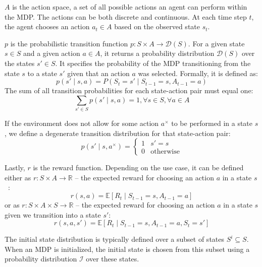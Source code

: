 \documentclass[
  digital,     %
  oneside,     %
  nosansbold,  %
  nocolorbold, %
  lof,         %
  lot,         %
]{fithesis4}
\begin{document}
$A$ is the action space, a set of all possible actions an agent can perform within the MDP. The actions can be both discrete and continuous. At each time step $t$, the agent chooses an action $a_t\in A$ based on the observed state $s_t$.

$p$ is the probabilistic transition function $p\colon S \times A \to \mathcal{D}(S)$. For a given state $s\in S$ and a given action $a\in A$, it returns a probability distribution $\mathcal{D}(S)$ over the states $s'\in S$. It specifies the probability of the MDP transitioning from the state $s$ to a state $s'$ given that an action $a$ was selected. Formally, it is defined as:
\begin{equation}
p(s' \mid s,a)=P(S_t=s'\mid S_{t-1}=s,A_{t-1}=a)    
\end{equation}
The sum of all transition probabilities for each state-action pair must equal one:
\begin{equation}
\sum_{s'\in S} p(s'\mid s,a)=1, \forall s \in S, \forall a \in A
\end{equation}

If the environment does not allow for some action $a^{\times}$ to be performed in a state $s$, we define a degenerate transition distribution for that state-action pair:
\begin{equation}
    p(s'\mid s, a^{\times}) =\begin{cases}1 & s' = s\\0 & \text{otherwise} \end{cases} 
\end{equation}

Lastly, $r$ is the reward function. Depending on the use case, it can be defined either as $r\colon S \times A \to \mathbb{R}$ -- the expected reward for choosing an action $a$ in a state $s$~\cite{PA230}:
\begin{equation}
r(s,a)= \mathbb{E} [R_t\mid S_{t-1}=s, A_{t-1}=a]
\end{equation}
or as $r\colon S\times A \times S \to \mathbb{R}$ -- the expected reward for choosing an action $a$ in a state $s$ given we transition into a state $s'$:
\begin{equation}
r(s, a, s')= \mathbb{E} [R_t\mid S_{t-1}=s, A_{t-1}=a, S_t=s']
\end{equation}

The initial state distribution is typically defined over a subset of states $S^i \subseteq S$. When an MDP is initialized, the initial state is chosen from this subset using a probability distribution $\mathcal{I}$ over these states.
\end{document}
